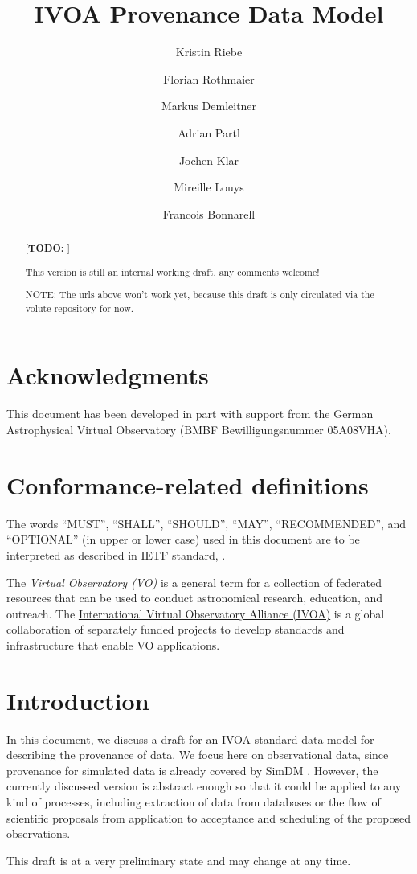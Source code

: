 \documentclass[11pt,a4paper]{ivoa}
\title{IVOA Provenance Data Model}
\author{Kristin Riebe}
\author{Florian Rothmaier}
\author{Markus Demleitner}
\author{Adrian Partl}
\author{Jochen Klar}
\author{Mireille Louys}
\author{Francois Bonnarell}
\newcommand{\TODO}[1]{\noindent \textcolor{todocolor}{[\textbf{TODO:} #1]}}
\begin{document}
\begin{abstract}
\TODO{}

This version is still an internal working draft, any comments welcome!

NOTE: The urls above won't work yet, because this draft is only circulated via the volute-repository for now.
\end{abstract}


\section*{Acknowledgments}

This document has been developed in part with support from the German
Astrophysical Virtual Observatory (BMBF Bewilligungsnummer 05A08VHA).



\section*{Conformance-related definitions}

The words ``MUST'', ``SHALL'', ``SHOULD'', ``MAY'', ``RECOMMENDED'', and
``OPTIONAL'' (in upper or lower case) used in this document are to be
interpreted as described in IETF standard, \citet{std:RFC2119}.

The \emph{Virtual Observatory (VO)} is
a general term for a collection of federated resources that can be used
to conduct astronomical research, education, and outreach.
The \href{http://www.ivoa.net}{International
Virtual Observatory Alliance (IVOA)} is a global
collaboration of separately funded projects to develop standards and
infrastructure that enable VO applications.


\section{Introduction}

In this document, we discuss a draft for an IVOA standard data model for describing the
provenance of data. We focus here on observational data, since provenance for
simulated data is already covered by SimDM 
\cite{std:SimDM}. However, the currently discussed version is abstract enough so that 
it could be applied to any kind of processes, including extraction of data from databases 
or the flow of scientific proposals from application to acceptance and scheduling of 
the proposed observations.

This draft is at a very preliminary state and may change at any time.
\end{document}
